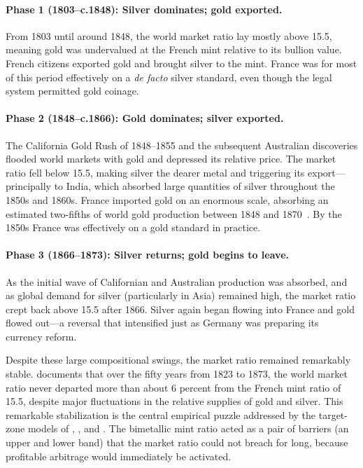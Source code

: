 \documentclass[12pt,letterpaper]{article}
\begin{document}
\paragraph{Phase 1 (1803--c.1848): Silver dominates; gold exported.}
From 1803 until around 1848, the world market ratio lay mostly above 15.5,
meaning gold was undervalued at the French mint relative to its bullion value.
French citizens exported gold and brought silver to the mint.  France was for most
of this period effectively on a \emph{de facto} silver standard, even though the
legal system permitted gold coinage.

\paragraph{Phase 2 (1848--c.1866): Gold dominates; silver exported.}
The California Gold Rush of 1848--1855 and the subsequent Australian discoveries
flooded world markets with gold and depressed its relative price.  The market ratio
fell below 15.5, making silver the dearer metal and triggering its export---
principally to India, which absorbed large quantities of silver throughout the 1850s
and 1860s.  France imported gold on an enormous scale, absorbing an estimated two-fifths of world
gold production between 1848 and 1870~\citep{wikipedia_bimetallism}.  By the 1850s
France was effectively on a gold standard in practice.

\paragraph{Phase 3 (1866--1873): Silver returns; gold begins to leave.}
As the initial wave of Californian and Australian production was absorbed, and as
global demand for silver (particularly in Asia) remained high, the market ratio
crept back above 15.5 after 1866.  Silver again began flowing into France and gold
flowed out---a reversal that intensified just as Germany was preparing its currency
reform.

Despite these large compositional swings, the market ratio remained remarkably
stable.  \citet{oppers2000} documents that over the fifty years from 1823 to 1873,
the world market ratio never departed more than about 6 percent from the French mint
ratio of 15.5, despite major fluctuations in the relative supplies of gold and
silver.  This remarkable stabilization is the central empirical puzzle addressed by
the target-zone models of \citet{oppers1995}, \citet{oppers2000}, and
\citet{velde_weber2000}.  The bimetallic mint ratio acted as a pair of barriers (an
upper and lower band) that the market ratio could not breach for long, because
profitable arbitrage would immediately be activated.
\end{document}
